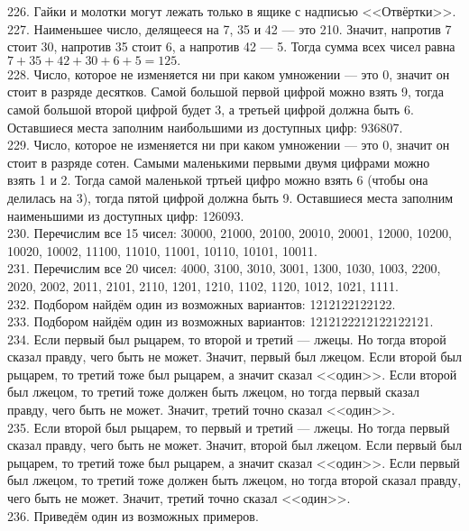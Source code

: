 226. Гайки и молотки могут лежать только в ящике с надписью <<Отвёртки>>.\\
227. Наименьшее число, делящееся на 7, 35 и 42 --- это 210. Значит, напротив 7 стоит 30, напротив 35 стоит 6, а напротив 42 --- 5. Тогда сумма всех чисел равна $7+35+42+30+6+5=125.$\\
228. Число, которое не изменяется ни при каком умножении --- это 0, значит он стоит в разряде десятков. Самой большой первой цифрой можно взять 9, тогда самой большой второй цифрой будет 3, а третьей цифрой должна быть 6. Оставшиеся места заполним наибольшими из доступных цифр: 936807.\\
229. Число, которое не изменяется ни при каком умножении --- это 0, значит он стоит в разряде сотен. Самыми маленькими первыми двумя цифрами можно взять 1 и 2. Тогда самой маленькой тртьей цифро можно взять 6 (чтобы она делилась на 3), тогда пятой цифрой должна быть 9. Оставшиеся места заполним наименьшими из доступных цифр: 126093.\\
230. Перечислим все 15 чисел: 30000, 21000, 20100, 20010, 20001, 12000, 10200, 10020, 10002, 11100, 11010, 11001, 10110, 10101, 10011.\\
231. Перечислим все 20 чисел: 4000, 3100, 3010, 3001, 1300, 1030, 1003, 2200, 2020, 2002, 2011, 2101, 2110, 1201, 1210, 1102, 1120, 1012, 1021, 1111.\\
232. Подбором найдём один из возможных вариантов: 1212122122122.\\
233. Подбором найдём один из возможных вариантов: 1212122212122122121.\\
234. Если первый был рыцарем, то второй и третий --- лжецы. Но тогда второй сказал правду, чего быть не может. Значит, первый был лжецом. Если второй был рыцарем, то третий тоже был рыцарем, а значит сказал <<один>>. Если второй был лжецом, то третий тоже должен быть лжецом, но тогда первый сказал правду, чего быть не может. Значит, третий точно сказал <<один>>.\\
235. Если второй был рыцарем, то первый и третий --- лжецы. Но тогда первый сказал правду, чего быть не может. Значит, второй был лжецом. Если первый был рыцарем, то третий тоже был рыцарем, а значит сказал <<один>>. Если первый был лжецом, то третий тоже должен быть лжецом, но тогда второй сказал правду, чего быть не может. Значит, третий точно сказал <<один>>.\\
236. Приведём один из возможных примеров.
\begin{center}
\begin{figure}[ht!]
\end{figure}
\end{center}
